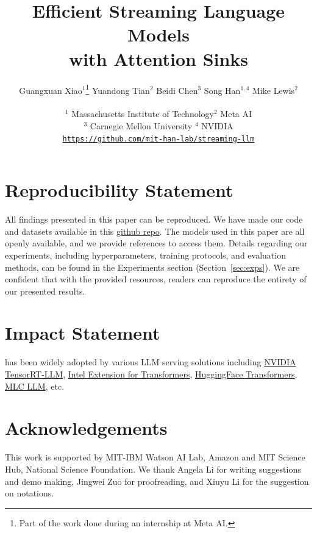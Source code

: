 \documentclass{article} %
\title{Efficient Streaming Language Models \\ with Attention Sinks}
\author{
Guangxuan Xiao$^{1}$\thanks{Part of the work done during an internship at Meta AI.} \quad Yuandong Tian$^2$ \quad Beidi Chen$^3$ \quad Song Han$^{1,4}$ \quad Mike Lewis$^2$ \\
\\ $^1$ Massachusetts Institute of Technology\quad $^2$ Meta AI
\\ $^3$ Carnegie Mellon University \quad $^4$ NVIDIA
\\ \texttt{\url{https://github.com/mit-han-lab/streaming-llm}}
}
\begin{document}
\maketitle









\section*{Reproducibility Statement}
All findings presented in this paper can be reproduced. We have made our code and datasets available in this \href{https://github.com/mit-han-lab/streaming-llm}{github repo}. The models used in this paper are all openly available, and we provide references to access them. Details regarding our experiments, including hyperparameters, training protocols, and evaluation methods, can be found in the Experiments section (Section~\ref{sec:exps}). We are confident that with the provided resources, readers can reproduce the entirety of our presented results.

\section*{Impact Statement}
\method has been widely adopted by various LLM serving solutions including \href{https://github.com/NVIDIA/TensorRT-LLM/tree/main/examples/llama#run-llama-with-streamingllm}{NVIDIA TensorRT-LLM}, \href{https://github.com/intel/intel-extension-for-transformers}{Intel Extension for Transformers}, \href{https://huggingface.co/docs/transformers/v4.39.3/en/internal/generation_utils#transformers.SinkCache}{HuggingFace Transformers}, \href{https://github.com/mlc-ai/mlc-llm/pull/1459}{MLC LLM}, etc.

\section*{Acknowledgements}
This work is supported by 
MIT-IBM Watson AI Lab,  
Amazon and MIT Science Hub,   
National Science Foundation.
We thank Angela Li for writing suggestions and demo making, Jingwei Zuo for proofreading, and Xiuyu Li for the suggestion on notations.



\clearpage

\end{document}
